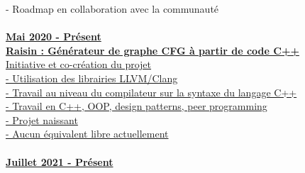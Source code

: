 \documentclass[a4paper]{article}
\begin{document}
{\begin{minipage}[t]{0.6\paperwidth}
{\begin{minipage}[H]{0.58\paperwidth}
{		\hspace{2cm} - Roadmap en collaboration avec la communauté\\
		}
		\ \\
%
		\href{https://github.com/conformism/raisin}{
		\textbf{Mai 2020 - Présent}\\
		\hspace{1cm} \textbf{Raisin : Générateur de graphe CFG à partir de code C++}\\
		\hspace{1cm} Initiative et co-création du projet\\
		\hspace{2cm} - Utilisation des librairies LLVM/Clang\\
		\hspace{2cm} - Travail au niveau du compilateur sur la syntaxe du langage C++\\
		\hspace{2cm} - Travail en C++, OOP, design patterns, peer programming\\
		\hspace{2cm} - Projet naissant\\
		\hspace{2cm} - Aucun équivalent libre actuellement\\
		}
		\ \\
		\href{https://github.com/conformism/cmake-utils}{
		\textbf{Juillet 2021 - Présent}\\
}
\end{minipage}}
\end{minipage}}
\end{document}
